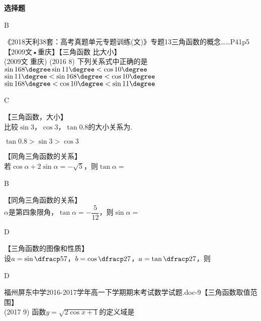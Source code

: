 \begin{exercise}{\bf 选择题}
\begin{answer}
        B
      \end{answer}
    \item 《2018天利38套：高考真题单元专题训练(文)》专题13三角函数的概念……P41p5【2009文•重庆】【三角函数 比大小】\\
      {\kaishu (2009文 \textbullet 重庆)}
      (2016  8)
      下列关系式中正确的是\xz
       {$\sin168\degree\sin11\degree<\cos10\degree$}
       {$\sin11\degree<\sin168\degree<\cos10\degree$}
       {$\sin168\degree<\cos10\degree<\sin11\degree$}
      \begin{answer}
        C
      \end{answer}
    \item 【三角函数，大小】\\
      比较$\sin 3$，$\cos 3$，$\tan 0.8$的大小关系为\tk.
      \begin{answer}
        $\tan 0.8>\sin 3>\cos 3$
      \end{answer}
    \item 【同角三角函数的关系】\\
      若$\cos\alpha+2\sin\alpha=-\sqrt{5}$，则$\tan\alpha=$\xz
      \begin{answer}
        B
      \end{answer}
    \item 【同角三角函数的关系】\\
      $\alpha$是第四象限角，$\tan\alpha=-\dfrac5{12}$，则$\sin\alpha=$\xz
      \begin{answer}
        D
      \end{answer}
    \item 【三角函数的图像和性质】\\
      设$a=\sin{\dfracp57}$，$b=\cos{\dfracp27}$，$a=\tan{\dfracp27}$，则\xz
      \begin{answer}
        D
      \end{answer}
    \item 福州屏东中学2016-2017学年高一下学期期末考试数学试题.doc-9【三角函数取值范围】\\
      (2017  9)
      函数$y=\sqrt{2\cos x+1}$的定义域是\xz

\end{exercise}
